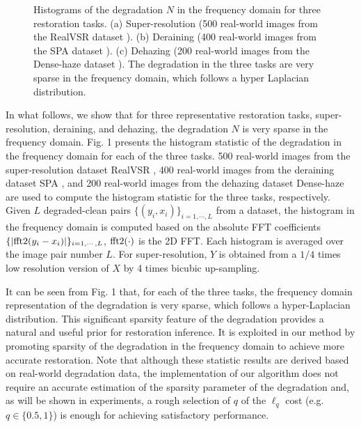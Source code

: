 \documentclass[10pt,journal,compsoc]{IEEEtran}
\begin{document}
\begin{figure}[!t]
	\centering
	\caption{Histograms of the degradation $N$ in the frequency domain for three restoration tasks. (a) Super-resolution (500 real-world images from the RealVSR dataset \cite{realVSR}). (b) Deraining (400 real-world images from the SPA dataset \cite{spa}). (c) Dehazing (200 real-world images from the Dense-haze dataset \cite{dense}). The degradation in the three tasks are very sparse in the frequency domain, which follows a hyper Laplacian distribution.}
	\label{fig_sparse}
\end{figure}

In what follows, we show that for three representative restoration tasks,
super-resolution, deraining, and dehazing, the degradation $N$ is very sparse
in the frequency domain. Fig. 1 presents the histogram statistic of the
degradation in the frequency domain for each of the three tasks.
500 real-world images from the super-resolution dataset RealVSR \cite{realVSR},
400 real-world images from the deraining dataset SPA \cite{spa}, and 200
real-world images from the dehazing dataset Dense-haze \cite{dense} are used to
compute the histogram statistic for the three tasks, respectively.
Given $L$ degraded-clean pairs $\{(y_i,x_i)\}_{i=1,\cdots,L}$ from a dataset,
the histogram in the frequency domain is computed based on
the absolute FFT coefficients $\{|{\rm{fft2}}(y_i-x_i)|\}_{i=1,\cdots,L}$,
${\rm{fft2}}(\cdot)$ is the 2D FFT. Each histogram is averaged over the image
pair number $L$. For super-resolution, $Y$ is obtained from a $1/4$ times
low resolution version of $X$ by 4 times bicubic up-sampling.

It can be seen from Fig. 1 that, for each of the three tasks,
the frequency domain representation of the degradation is very sparse,
which follows a hyper-Laplacian distribution.
This significant sparsity feature of the degradation provides
a natural and useful prior for restoration inference.
It is exploited in our method by promoting sparsity of the
degradation in the frequency domain %
to achieve more accurate restoration.
Note that although these statistic results are derived based on
real-world degradation data, the implementation of our algorithm
does not require an accurate estimation of the sparsity parameter
of the degradation and, as will be shown in experiments,
a rough selection of $q$ of the $\ell_q$ cost
(e.g. $q\in\{0.5,1\}$) is enough for achieving satisfactory performance.
\end{document}
